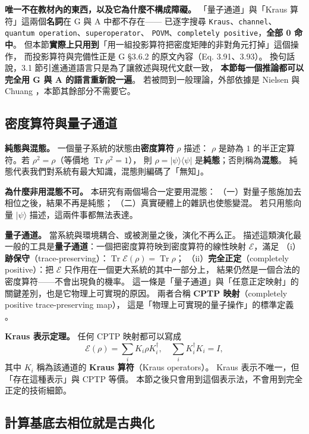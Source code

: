 \documentclass[11pt,a4paper]{ctexart}
\begin{document}
\textbf{唯一不在教材內的東西，以及它為什麼不構成障礙。}
「量子通道」與「Kraus 算符」這兩個\textbf{名詞}在 G 與 A
中都不存在------ 已逐字搜尋
\texttt{Kraus}、\texttt{channel}、\texttt{quantum\ operation}、\texttt{superoperator}、
\texttt{POVM}、\texttt{completely\ positive}，\textbf{全部 0 命中}。
但本節\textbf{實際上只用到}「用一組投影算符把密度矩陣的非對角元打掉」這個操作，
而投影算符與完備性正是 G §3.6.2 的原文內容（Eq. 3.91、3.93）。
換句話說，3.1 節引進通道語言只是為了讓敘述與現代文獻一致，
\textbf{本節每一個推論都可以完全用 G 與 A 的語言重新說一遍}。
若被問到一般理論，外部依據是 Nielsen 與 Chuang
\cite{nielsen2010}，本節其餘部分不需要它。

\subsection{密度算符與量子通道}

\textbf{純態與混態。} 一個量子系統的狀態由\textbf{密度算符} \(\rho\)
描述： \(\rho\) 是跡為 \(1\) 的半正定算符。若
\(\rho^{2} = \rho\)（等價地 \(\operatorname{Tr}\rho^{2} = 1\)）， 則
\(\rho = |\psi\rangle\langle\psi|\)
是\textbf{純態}；否則稱為\textbf{混態}。
純態代表我們對系統有最大知識，混態則編碼了「無知」。

\textbf{為什麼非用混態不可。} 本研究有兩個場合一定要用混態：
（一）對量子態施加去相位之後，結果不再是純態；
（二）真實硬體上的雜訊也使態變混。 若只用態向量 \(|\psi\rangle\)
描述，這兩件事都無法表達。

\textbf{量子通道。} 當系統與環境耦合、或被測量之後，演化不再么正。
描述這類演化最一般的工具是\textbf{量子通道}：一個把密度算符映到密度算符的線性映射
\(\mathcal{E}\)，滿足
（i）\textbf{跡保守}（trace-preserving）：\(\operatorname{Tr}\mathcal{E}(\rho) = \operatorname{Tr}\rho\)；
（ii）\textbf{完全正定}（completely positive）：把 \(\mathcal{E}\)
只作用在一個更大系統的其中一部分上，
結果仍然是一個合法的密度算符------不會出現負的機率。
這一條是「量子通道」與「任意正定映射」的關鍵差別，也是它物理上可實現的原因。
兩者合稱 \textbf{CPTP 映射}（completely positive trace-preserving
map）， 這是「物理上可實現的量子操作」的標準定義 \cite{nielsen2010}。

\textbf{Kraus 表示定理。} 任何 CPTP 映射都可以寫成
\[\mathcal{E}(\rho) = \sum_{i}K_{i}\rho K_{i}^{\dagger},\quad\sum_{i}K_{i}^{\dagger}K_{i} = I,\]
其中 \(K_{i}\) 稱為該通道的 \textbf{Kraus 算符}（Kraus operators）。
Kraus 表示不唯一，但「存在這種表示」與 CPTP 等價。
本節之後只會用到這個表示法，不會用到完全正定的技術細節。

\subsection{計算基底去相位就是古典化}
\end{document}
